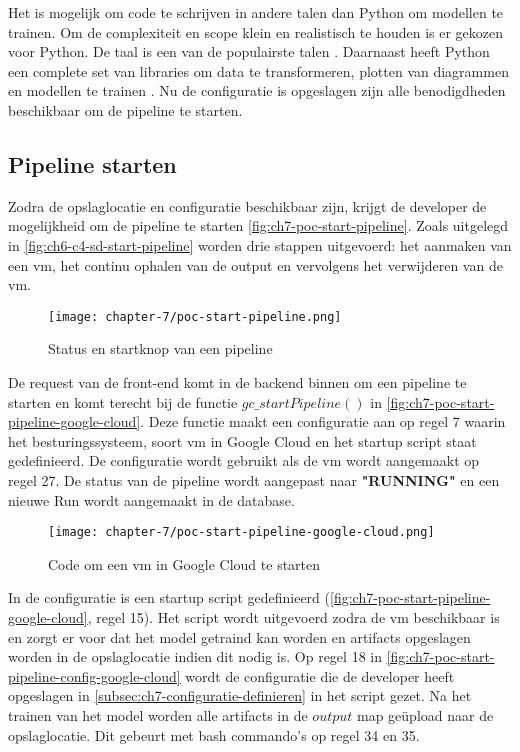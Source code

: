 Het is mogelijk om code te schrijven in andere talen dan Python om modellen te trainen. Om de complexiteit en scope klein en realistisch te houden is er gekozen voor Python. De taal is een van de populairste talen \cite{stack-overflow-survey-2020-loved-dreaded-framework-libraries-tools}. Daarnaast heeft Python een complete set van libraries om data te transformeren, plotten van diagrammen en modellen te trainen \cite{python-libraries}. Nu de configuratie is opgeslagen zijn alle benodigdheden beschikbaar om de pipeline te starten. 

\subsection{Pipeline starten}\label{subsec:ch7-pipeline-starten}
Zodra de opslaglocatie en configuratie beschikbaar zijn, krijgt de developer de mogelijkheid om de pipeline te starten \autoref{fig:ch7-poc-start-pipeline}. Zoals uitgelegd in \autoref{fig:ch6-c4-sd-start-pipeline} worden drie stappen uitgevoerd: het aanmaken van een \acrshort{vm}, het continu ophalen van de output en vervolgens het verwijderen van de \acrshort{vm}.

\begin{figure}[hbt!]
  \centering
  \texttt{[image: chapter-7/poc-start-pipeline.png]}
  \caption{Status en startknop van een pipeline}
  \label{fig:ch7-poc-start-pipeline}
\end{figure}

De request van de front-end komt in de backend binnen om een pipeline te starten en komt terecht bij de functie \(gc\_startPipeline()\) in \autoref{fig:ch7-poc-start-pipeline-google-cloud}. Deze functie maakt een configuratie aan op regel 7 waarin het besturingssysteem, soort \acrshort{vm} in Google Cloud en het startup script staat gedefinieerd. De configuratie wordt gebruikt als de \acrshort{vm} wordt aangemaakt op regel 27. De status van de pipeline wordt aangepast naar \textbf{"RUNNING"} en een nieuwe Run wordt aangemaakt in de database.

\begin{figure}[hbt!]
  \centering
  \texttt{[image: chapter-7/poc-start-pipeline-google-cloud.png]}
  \caption{Code om een \acrfull{vm} in Google Cloud te starten}
  \label{fig:ch7-poc-start-pipeline-google-cloud}
\end{figure}

\newpage

In de configuratie is een startup script gedefinieerd (\autoref{fig:ch7-poc-start-pipeline-google-cloud}, regel 15). Het script wordt uitgevoerd zodra de \acrshort{vm} beschikbaar is en zorgt er voor dat het model getraind kan worden en \glspl{artifact} opgeslagen worden in de opslaglocatie indien dit nodig is. Op regel 18 in \autoref{fig:ch7-poc-start-pipeline-config-google-cloud} wordt de configuratie die de developer heeft opgeslagen in \autoref{subsec:ch7-configuratie-definieren} in het script gezet. Na het trainen van het model worden alle \glspl{artifact} in de \(output\) map geüpload naar de opslaglocatie. Dit gebeurt met bash commando's op regel 34 en 35.

